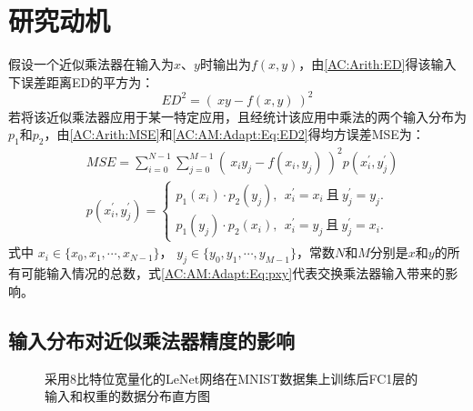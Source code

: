 \section{研究动机}

假设一个近似乘法器在输入为$x$、$y$时输出为$f(x,y)$，由\eqref{AC:Arith:ED}得该输入下误差距离ED的平方为：
\begin{equation}
    ED^2 = ( \ xy - f(x,y) \ ) ^2
\label{AC:AM:Adapt:Eq:ED2}
\end{equation}
若将该近似乘法器应用于某一特定应用，且经统计该应用中乘法的两个输入分布为$p_1$和$p_2$，由\eqref{AC:Arith:MSE}和\eqref{AC:AM:Adapt:Eq:ED2}得均方误差MSE为：
\begin{align}
    & MSE = \sum_{i=0}^{N-1} \sum_{j=0}^{M-1} ( \ x_i y_j - f(x_i,y_j) \ ) ^2 p(x^{\prime}_i, y^{\prime}_j) \label{AC:AM:Adapt:Eq:MSE} \\
    & p(x^{\prime}_i, y^{\prime}_j) = \left\{
        \begin{aligned}
          p_1(x_i) \cdot p_2(y_j),\ \ x^{\prime}_i=x_i\ \text{且}\ y^{\prime}_j=y_j. \\
          p_1(y_j) \cdot p_2(x_i),\ \ x^{\prime}_i=y_j\ \text{且}\ y^{\prime}_j=x_i.
        \end{aligned}
        \right.      \label{AC:AM:Adapt:Eq:pxy}
\end{align}
式中 $x_i \in \{x_0, x_1, \cdots , x_{N-1}\}$， $y_j \in \{y_0, y_1, \cdots , y_{M-1}\}$，常数$N$和$M$分别是$x$和$y$的所有可能输入情况的总数，式\eqref{AC:AM:Adapt:Eq:pxy}代表交换乘法器输入带来的影响。

\subsection{输入分布对近似乘法器精度的影响}

\begin{figure}[!htb]
    \centering
    \centering
    \caption{采用8比特位宽量化的LeNet网络在MNIST数据集上训练后FC1层的输入和权重的数据分布直方图}
\label{DNN:LeNet_MNIST:Fig:FC1_distribution}
\end{figure}

